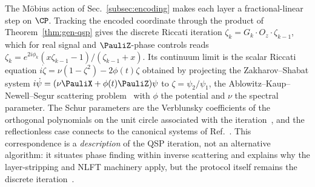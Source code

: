 \begin{remark}
	\label{rem:riccati}
	The M\"obius action of Sec.~\ref{subsec:encoding} makes each
	layer a fractional-linear step on $\CP$.  Tracking the encoded
	coordinate through the product of Theorem~\ref{thm:gen-qsp}
	gives the discrete Riccati iteration
	$\zeta_k=G_k\cdot O_z\cdot\zeta_{k-1}$, which for real signal
	and $\PauliZ$-phase controls reads
	$\zeta_k=e^{2i\phi_k}(x\zeta_{k-1}-1)/(\zeta_{k-1}+x)$.  Its
	continuum limit is the scalar Riccati equation
	$i\dot\zeta=\nu(1-\zeta^2)-2\phi(t)\zeta$ obtained by projecting
	the Zakharov--Shabat system
	$i\dot\psi=(\nu\PauliX+\phi(t)\PauliZ)\psi$ to
	$\zeta=\psi_2/\psi_1$, the Ablowitz--Kaup--Newell--Segur
	scattering problem~\cite{AblowitzKaupNewellSegur1974,FaddeevTakhtajan1987}
	with $\phi$ the potential and $\nu$ the spectral parameter.  The
	Schur parameters are the Verblunsky coefficients of the
	orthogonal polynomials on the unit circle associated with the
	iteration~\cite{Simon2005OPUC}, and the reflectionless case
	connects to the canonical systems of
	Ref.~\cite{BessonovLukicYuditskii2024}.  This correspondence is
	a \emph{description} of the QSP iteration, not an alternative
	algorithm: it situates phase finding within inverse scattering
	and explains why the layer-stripping and NLFT machinery apply,
	but the protocol itself remains the discrete
	iteration~\cite{TaoThieleTsai,NiSarkarYingLin2025}.
\end{remark}
